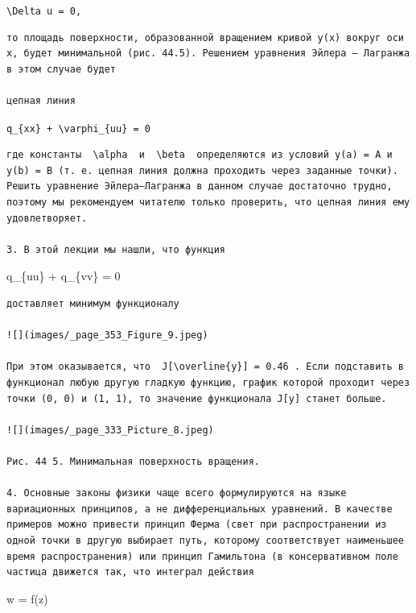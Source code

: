 \documentclass[
  ukrainian,
]{article}
\begin{document}
\texttt{\textbackslash{}Delta\ u\ =\ 0,}

\begin{verbatim}
то площадь поверхности, образованной вращением кривой y(x) вокруг оси x, будет минимальной (рис. 44.5). Решением уравнения Эйлера — Лагранжа в этом случае будет

цепная линия
\end{verbatim}

\texttt{q\_\{xx\}\ +\ \textbackslash{}varphi\_\{uu\}\ =\ 0}

\begin{verbatim}
где константы  \alpha  и  \beta  определяются из условий y(a) = A и y(b) = B (т. е. цепная линия должна проходить через заданные точки). Решить уравнение Эйлера—Лагранжа в данном случае достаточно трудно, поэтому мы рекомендуем читателю только проверить, что цепная линия ему удовлетворяет.

3. В этой лекции мы нашли, что функция
\end{verbatim}

q\_\{uu\} + q\_\{vv\} = 0

\begin{verbatim}
доставляет минимум функционалу

![](images/_page_353_Figure_9.jpeg)

При этом оказывается, что  J[\overline{y}] = 0.46 . Если подставить в функционал любую другую гладкую функцию, график которой проходит через точки (0, 0) и (1, 1), то значение функционала J[y] станет больше.

![](images/_page_333_Picture_8.jpeg)

Рис. 44 5. Минимальная поверхность вращения.

4. Основные законы физики чаще всего формулируются на языке вариационных принципов, а не дифференциальных уравнений. В качестве примеров можно привести принцип Ферма (свет при распространении из одной точки в другую выбирает путь, которому соответствует наименьшее время распространения) или принцип Гамильтона (в консервативном поле частица движется так, что интеграл действия
\end{verbatim}

w = f(z)
\end{document}
